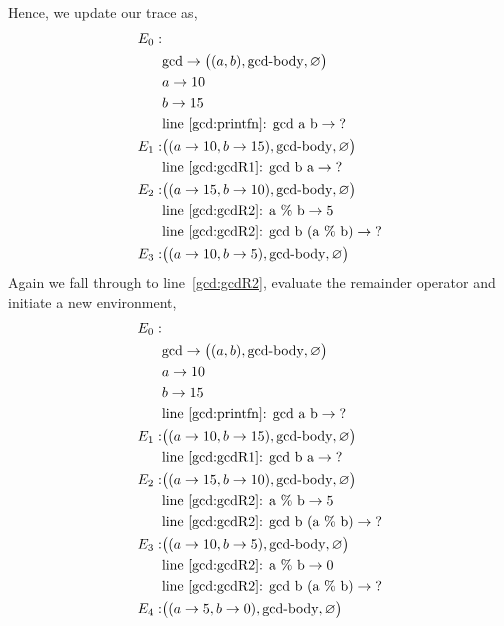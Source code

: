 Hence, we update our trace as,
\begin{align*}
  E_0:&\\
      & \text{gcd} \rightarrow \big((a, b), \text{gcd-body}, \varnothing\big)\\
      & a \rightarrow 10\\
      & b \rightarrow 15\\
      & \text{line~\ref{gcd:printfn}: gcd a b} \rightarrow \text{?}\\
  E_1:& \big((a \rightarrow 10, b \rightarrow 15), \text{gcd-body}, \varnothing\big)\\
      & \text{line~\ref{gcd:gcdR1}: gcd b a} \rightarrow \text{?}\\
  E_2:& \big((a \rightarrow 15, b \rightarrow 10), \text{gcd-body}, \varnothing\big)\\
      & \text{line~\ref{gcd:gcdR2}: a \% b} \rightarrow 5\\
      & \text{line~\ref{gcd:gcdR2}: gcd b (a \% b)} \rightarrow \text{?}\\
  E_3:& \big((a \rightarrow 10, b \rightarrow 5), \text{gcd-body}, \varnothing\big)\\
\end{align*}
Again we fall through to line~\ref{gcd:gcdR2}, evaluate the remainder operator and initiate a new environment,
\begin{align*}
  E_0:&\\
      & \text{gcd} \rightarrow \big((a, b), \text{gcd-body}, \varnothing\big)\\
      & a \rightarrow 10\\
      & b \rightarrow 15\\
      & \text{line~\ref{gcd:printfn}: gcd a b} \rightarrow \text{?}\\
  E_1:& \big((a \rightarrow 10, b \rightarrow 15), \text{gcd-body}, \varnothing\big)\\
      & \text{line~\ref{gcd:gcdR1}: gcd b a} \rightarrow \text{?}\\
  E_2:& \big((a \rightarrow 15, b \rightarrow 10), \text{gcd-body}, \varnothing\big)\\
      & \text{line~\ref{gcd:gcdR2}: a \% b} \rightarrow 5\\
      & \text{line~\ref{gcd:gcdR2}: gcd b (a \% b)} \rightarrow \text{?}\\
  E_3:& \big((a \rightarrow 10, b \rightarrow 5), \text{gcd-body}, \varnothing\big)\\
      & \text{line~\ref{gcd:gcdR2}: a \% b} \rightarrow 0\\
      & \text{line~\ref{gcd:gcdR2}: gcd b (a \% b)} \rightarrow \text{?}\\
  E_4:& \big((a \rightarrow 5, b \rightarrow 0), \text{gcd-body}, \varnothing\big)\\
\end{align*}

